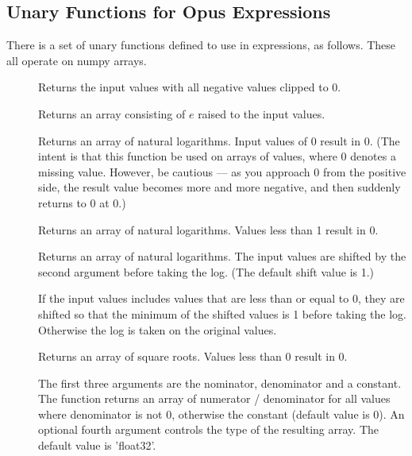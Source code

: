 \subsection{Unary Functions for Opus Expressions}
\label{sec:functions-for-opus-expressions}

There is a set of unary functions defined to use in expressions, as
follows.  These all operate on numpy arrays.

\begin{description}

\item[]
  Returns the input values with all negative values clipped to 0.

\item[] Returns an array
  consisting of $e$ raised to the input values.

\item[] Returns an array of natural
  logarithms.  Input values of 0 result in 0.  (The intent is that this
  function be used on arrays of values, where 0 denotes a missing value.
  However, be cautious --- as you approach 0 from the positive side, the
  result value becomes more and more negative, and then suddenly returns to
  0 at 0.)

\item[]
  Returns an array of natural logarithms. Values less than 1 result in 0.

\item[]
  Returns an array of natural logarithms.  The input values are shifted by
  the second argument before taking the log.  (The default shift value is 1.)

\item[] If the input values includes values that are less than or equal
  to 0, they are shifted so that the minimum of the shifted values is 1
  before taking the log.  Otherwise the log is taken on the original
  values.

\item[] Returns an array of
  square roots.  Values less than 0 result in 0.

\item[] The first three arguments are the nominator, denominator and a
  constant. The function returns an array of numerator / denominator for
  all values where denominator is not 0, otherwise the constant (default
  value is 0). An optional fourth argument controls the type of the
  resulting array. The default value is 'float32'.
\end{description}


